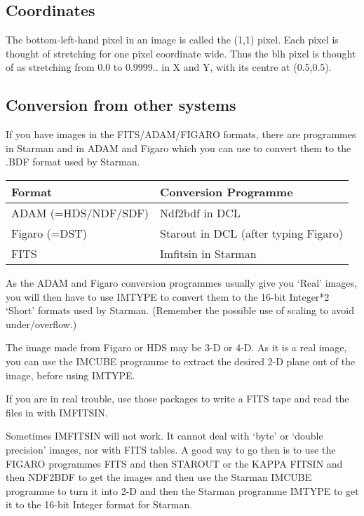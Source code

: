 \subsection{Coordinates}

The bottom-left-hand pixel in an image is called the (1,1) pixel. Each
pixel is thought of stretching for one pixel coordinate wide. Thus the 
blh pixel is thought of as stretching from 0.0 to 0.9999.. in X and Y,
with its centre at (0.5,0.5).


\subsection{Conversion from other systems}

If you have images in the FITS/ADAM/FIGARO formats, there are 
programmes in Starman and in ADAM and Figaro which you can use to 
convert them to the .BDF format used by Starman. 

\hspace{4ex} \begin{tabular}[c]{|l|l|} \hline
   Format              &   Conversion Programme \\ \hline
   ADAM (=HDS/NDF/SDF) &   Ndf2bdf in DCL \\
   Figaro (=DST)       &   Starout in DCL (after typing Figaro) \\
   FITS                &   Imfitsin in Starman \\ \hline
\end{tabular}

As the ADAM and Figaro conversion programmes usually give you `Real'
images, you will then have to use IMTYPE to convert them to the 16-bit
Integer*2 `Short' formats used by Starman. (Remember the possible use 
of scaling to avoid under/overflow.)

The image made from Figaro or HDS may be 3-D or 4-D. As it is
a real image, you can use the IMCUBE programme to extract
the desired 2-D plane out of the image, before using IMTYPE.
    
If you are in real trouble, use those packages to write a FITS tape
and read the files in with IMFITSIN.

Sometimes IMFITSIN will not work. It cannot deal with `byte' or
`double precision' images, nor with FITS tables.
A good way to go then is to use the FIGARO programmes
FITS and then STAROUT or the KAPPA FITSIN and then NDF2BDF to get the
images and then use the Starman IMCUBE programme
to turn it into 2-D and then the Starman programme IMTYPE to get it
to the 16-bit Integer format for Starman.


